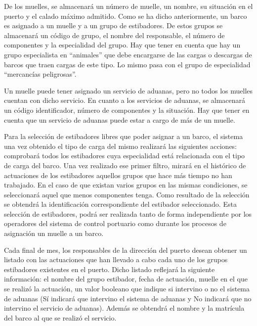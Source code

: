 \documentclass[a4paper]{article}
\begin{document}
De los muelles, se almacenará un número de muelle, un nombre, su situación en el puerto y el calado máximo admitido. Como se ha dicho anteriormente, un barco es asignado a un muelle y a un grupo de estibadores. De estos grupos se almacenará un código de grupo, el nombre del responsable, el número de componentes y la especialidad del grupo. Hay que tener en cuenta que hay un grupo especialista en “animales” que debe encargarse de las cargas o descargas de barcos que traen cargas de este tipo. Lo mismo pasa con el grupo de especialidad “mercancías peligrosas”.

Un muelle puede tener asignado un servicio de aduanas, pero no todos los muelles cuentan con dicho servicio. En cuanto a los servicios de aduanas, se almacenará un código identificador, número de componentes y la situación. Hay que tener en cuenta que un servicio de aduanas puede estar a cargo de más de un muelle.

Para la selección de estibadores libres que poder asignar a un barco, el sistema una vez obtenido el tipo de carga del mismo realizará las siguientes acciones: comprobará todos los estibadores cuya especialidad está relacionada con el tipo de carga del barco. Una vez realizado ese primer filtro, mirará en el histórico de actuaciones de los estibadores aquellos grupos que hace más tiempo no han trabajado. En el caso de que existan varios grupos en las mismas condiciones, se seleccionará aquel que menos componentes tenga. Como resultado de la selección se obtendrá la identificación correspondiente del estibador seleccionado. Esta selección de estibadores, podrá ser realizada tanto de forma independiente por los operadores del sistema de control portuario como durante los procesos de asignación un muelle a un barco.

Cada final de mes, los responsables de la dirección del puerto desean obtener un listado con las actuaciones que han llevado a cabo cada uno de los grupos estibadores existentes en el puerto. Dicho listado reflejará la siguiente información: el nombre del grupo estibador, fecha de actuación, muelle en el que se realizó la actuación, un valor booleano que indique si intervino o no el sistema de aduanas (Sí indicará que intervino el sistema de aduanas y No indicará que no intervino el servicio de aduanas). Además se obtendrá el nombre y la matrícula del barco al que se realizó el servicio.
\end{document}
